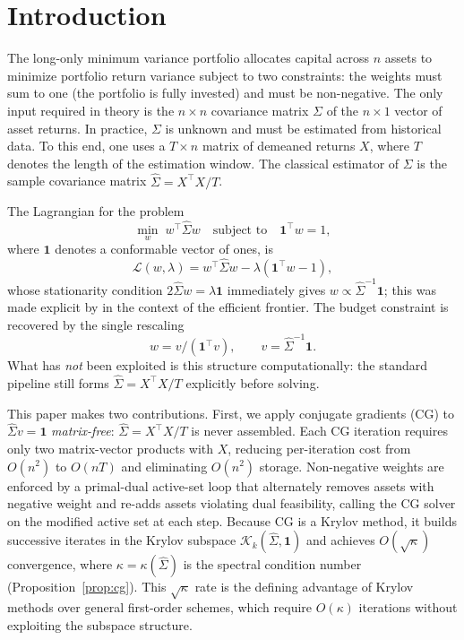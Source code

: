 \section{Introduction}

The long-only minimum variance portfolio allocates capital across $n$ assets to minimize
portfolio return variance subject to two constraints: the weights must sum to one (the
portfolio is fully invested) and must be non-negative. The only input required in theory
is the $n \times n$ covariance matrix $\Sigma$ of the $n \times 1$ vector of asset
returns. In practice, $\Sigma$ is unknown and must be estimated from historical data.
To this end, one uses a $T\times n$ matrix of demeaned returns $X$, where $T$ denotes
the length of the estimation window. The classical estimator of $\Sigma$ is the sample
covariance matrix $\hat \Sigma = X^\top X/T$.

The Lagrangian for the problem
\[
\min_w\; w^\top \hat \Sigma w \quad \text{subject to} \quad \mathbf{1}^\top w = 1,
\]
where $\mathbf{1}$ denotes a conformable vector of ones, is
\[
\mathcal{L}(w,\lambda) = w^\top \hat \Sigma w - \lambda(\mathbf{1}^\top w - 1),
\]
whose stationarity condition $2 \hat \Sigma w = \lambda\mathbf{1}$ immediately gives
$w \propto \hat \Sigma^{-1}\mathbf{1}$; this was made explicit by \cite{merton1972} in
the context of the efficient frontier. The budget constraint is recovered by the single
rescaling
\[
w = v/(\mathbf{1}^\top v), \qquad v = \hat \Sigma^{-1}\mathbf{1}.
\]
What has \emph{not} been exploited is this structure computationally: the standard
pipeline still forms $\hat \Sigma = X^\top X/T$ explicitly before solving.

This paper makes two contributions. First, we apply conjugate gradients (CG) to
$\hat \Sigma v = \mathbf{1}$ \emph{matrix-free}: $\hat \Sigma = X^\top X/T$ is never
assembled. Each CG iteration requires only two matrix-vector products with $X$, reducing
per-iteration cost from $O(n^2)$ to $O(nT)$ and eliminating $O(n^2)$ storage.
Non-negative weights are enforced by a primal-dual active-set loop that alternately removes
assets with negative weight and re-adds assets violating dual feasibility, calling the CG
solver on the modified active set at each step. Because CG is a Krylov method, it builds
successive iterates in the Krylov subspace $\mathcal{K}_k(\hat\Sigma, \mathbf{1})$ and
achieves $O(\sqrt\kappa)$ convergence, where $\kappa = \kappa(\hat\Sigma)$
is the spectral condition number (Proposition~\ref{prop:cg}). This $\sqrt\kappa$ rate is the defining advantage
of Krylov methods over general first-order schemes, which require $O(\kappa)$
iterations without exploiting the subspace structure.


